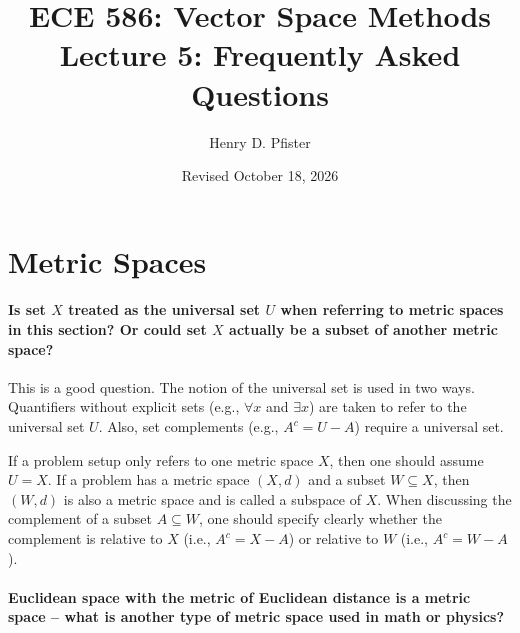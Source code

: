 \documentclass[10pt,english]{article}
\begin{document}
\title{ECE 586: Vector Space Methods \\ Lecture 5: Frequently Asked Questions}
\author{Henry D. Pfister \\ \univ}
\date{Revised October 18, 2026}

\maketitle

\section{Metric Spaces}

\paragraph{Is set $X$ treated as the universal set $U$ when referring to metric spaces in this section? Or could set $X$ actually be a subset of another metric space?}

This is a good question.
The notion of the universal set is used in two ways.
Quantifiers without explicit sets (e.g., $\forall x$ and $\exists x$) are taken to refer to the universal set $U$.
Also, set complements (e.g.,  $A^c = U - A$) require a universal set.

If a problem setup only refers to one metric space $X$, then one should assume $U=X$.
If a problem has a metric space $(X,d)$ and a subset $W \subseteq X$, then $(W,d)$ is also a metric space and is called a subspace of $X$.
When discussing the complement of a subset $A \subseteq W$, one should specify clearly whether the complement is relative to $X$ (i.e., $A^c = X-A$) or relative to $W$ (i.e., $A^c = W-A$).


\paragraph{Euclidean space with the metric of Euclidean distance is a metric space -- what is another type of metric space used in math or physics?} %
\end{document}
